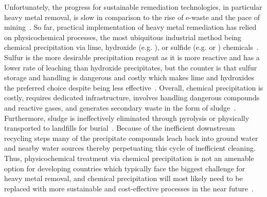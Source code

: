 \documentclass[../main/main]{subfiles}
\begin{document}
Unfortunately, the progress for sustainable remediation technologies, in particular heavy metal removal, is slow in comparison to the rise of e-waste and the pace of mining~\cite{rucevska2015}. So far, practical implementation of heavy metal remediation has relied on physicochemical processes, the most ubiquitous industrial method being chemical precipitation via lime, hydroxide (e.g. ), or sulfide (e.g.  or \HS{}) chemicals~\cite{fu2011removal}. Sulfur is the more desirable precipitation reagent as it is more reactive and has a lower rate of leaching than hydroxide precipitates, but the counter is that sulfur storage and handling is dangerous and costly which makes lime and hydroxides the preferred choice despite being less effective~\cite{fu2011removal}.
Overall, chemical precipitation is costly, requires dedicated infrastructure, involves handling dangerous compounds and reactive gases, and generates secondary waste in the form of sludge~\cite{fu2011removal,kurniawan2006,barakat2011new}.
Furthermore, sludge is ineffectively eliminated through pyrolysis or physically transported to landfills for burial~\cite{kurniawan2006,kumargupta2012}. Because of the inefficient downstream recycling steps many of the precipitate compounds leach back into ground water and nearby water sources thereby perpetuating this cycle of inefficient cleaning. Thus, physicochemical treatment via chemical precipitation is not an amenable option for developing countries which typically face the biggest challenge for heavy metal removal, and chemical precipitation will most likely need to be replaced with more sustainable and cost-effective processes in the near future~\cite{kumargupta2012}.
\end{document}
